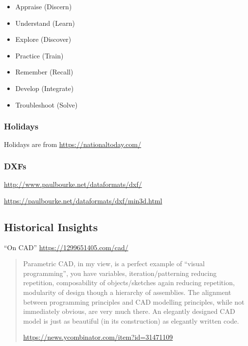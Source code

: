 \documentclass{ltxdoc}
\begin{document}
\begin{itemize}
\item Appraise (Discern)
\item Understand (Learn)
\item Explore (Discover)
\item Practice (Train)
\item Remember (Recall)
\item Develop (Integrate)
\item Troubleshoot (Solve)
\end{itemize}

\subsubsection*{Holidays}

Holidays are from \url{https://nationaltoday.com/}

\subsubsection*{DXFs}

\url{http://www.paulbourke.net/dataformats/dxf/}

\noindent\url{https://paulbourke.net/dataformats/dxf/min3d.html}

\subsection*{Historical Insights}



``On CAD'' \url{https://1299651405.com/cad/}

\begin{quotation}
\noindent Parametric CAD, in my view, is a perfect example of ``visual programming'', you have variables, iteration/patterning reducing repetition, composability of objects/\allowbreak sketches again reducing repetition, modularity of design though a hierarchy of assemblies. The alignment between programming principles and CAD modelling principles, while not immediately obvious, are very much there. An elegantly designed CAD model is just as beautiful (in its construction) as elegantly written code.

\noindent \url{https://news.ycombinator.com/item?id=31471109}
\end{quotation}
\end{document}
